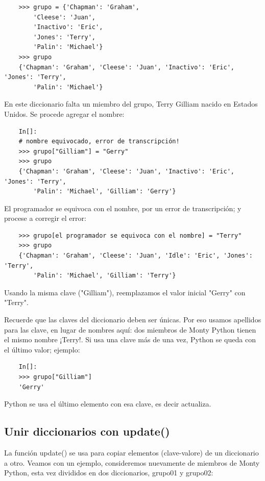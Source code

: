 \begin{lstlisting}
	>>> grupo = {'Chapman': 'Graham', 
		'Cleese': 'Juan', 
		'Inactivo': 'Eric', 
		'Jones': 'Terry', 
		'Palin': 'Michael'}
	>>> grupo
	{'Chapman': 'Graham', 'Cleese': 'Juan', 'Inactivo': 'Eric', 'Jones': 'Terry',
		'Palin': 'Michael'}
\end{lstlisting}

En este diccionario falta un miembro del grupo, Terry Gilliam nacido en Estados Unidos. 
Se procede agregar el nombre:

\begin{lstlisting}
	In[]:
	# nombre equivocado, error de transcripción! 
	>>> grupo["Gilliam"] = "Gerry"
	>>> grupo
	{'Chapman': 'Graham', 'Cleese': 'Juan', 'Inactivo': 'Eric', 'Jones': 'Terry', 
		'Palin': 'Michael', 'Gilliam': 'Gerry'}
\end{lstlisting}

El programador se equivoca con el nombre, por un error de transcripción; y procese a corregir el error:

\begin{lstlisting} 
	>>> grupo[el programador se equivoca con el nombre] = "Terry"
	>>> grupo
	{'Chapman': 'Graham', 'Cleese': 'Juan', 'Idle': 'Eric', 'Jones': 'Terry',
		'Palin': 'Michael', 'Gilliam': 'Terry'}
\end{lstlisting}

Usando la misma clave ({}"{}Gilliam{}"{}), reemplazamos el valor inicial {}"{}Gerry{}"{} con {}"{}Terry{}"{}.

Recuerde que las claves del diccionario deben ser únicas. Por eso usamos apellidos para las clave,
en lugar de nombres aquí: dos miembros de Monty Python tienen el mismo nombre ¡Terry!. Si usa una clave más de una vez, Python se queda con el último valor; ejemplo: 

\begin{lstlisting}
	In[]:
	>>> grupo["Gilliam"]
	'Gerry'
\end{lstlisting}
Python se usa el último elemento con esa clave, es decir actualiza.

\subsection{Unir diccionarios con update()}

La función {\ttfamily update()} se usa para copiar elementos (clave-valore) de un diccionario a 
otro. Veamos con un ejemplo, consideremos nuevamente de miembros de Monty Python, esta vez divididos en dos  diccionarios,   grupo01 y grupo02:


